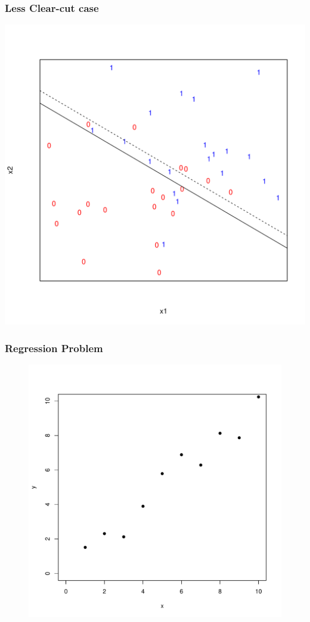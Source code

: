 \documentclass[xcolor=x11names,compress]{beamer}\usepackage[]{graphicx}\usepackage[]{color}
\newenvironment{knitrout}{}{} %
\begin{document}
\begin{frame}
  \frametitle{Less Clear-cut case}
\begin{knitrout}\tiny
{}\color{fgcolor}

{\centering \includegraphics[width=.6\linewidth]{figure/beamer-predmod6-1} 

}



\end{knitrout}
\end{frame}


\begin{frame}[plain]
  \frametitle{Regression Problem}
\begin{figure}
\centering
\begin{knitrout}\tiny
{}\color{fgcolor}

{\centering \includegraphics[width=.6\linewidth]{figure/beamer-unnamed-chunk-40-1} 

}



\end{knitrout}
\end{figure}
\end{frame}
\end{document}
